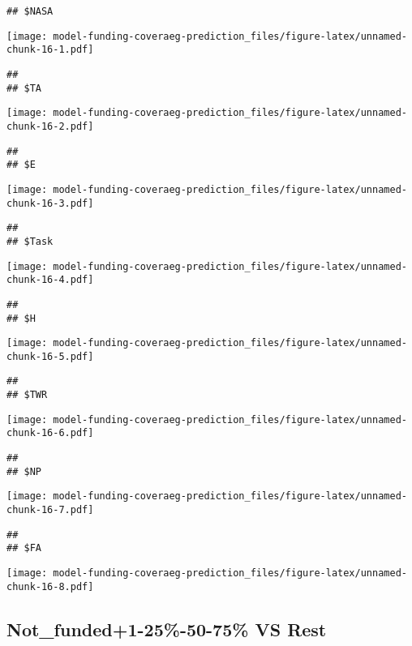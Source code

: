 \documentclass[]{article}
\begin{document}
\begin{verbatim}
## $NASA
\end{verbatim}

\texttt{[image: model-funding-coveraeg-prediction\_files/figure-latex/unnamed-chunk-16-1.pdf]}

\begin{verbatim}
## 
## $TA
\end{verbatim}

\texttt{[image: model-funding-coveraeg-prediction\_files/figure-latex/unnamed-chunk-16-2.pdf]}

\begin{verbatim}
## 
## $E
\end{verbatim}

\texttt{[image: model-funding-coveraeg-prediction\_files/figure-latex/unnamed-chunk-16-3.pdf]}

\begin{verbatim}
## 
## $Task
\end{verbatim}

\texttt{[image: model-funding-coveraeg-prediction\_files/figure-latex/unnamed-chunk-16-4.pdf]}

\begin{verbatim}
## 
## $H
\end{verbatim}

\texttt{[image: model-funding-coveraeg-prediction\_files/figure-latex/unnamed-chunk-16-5.pdf]}

\begin{verbatim}
## 
## $TWR
\end{verbatim}

\texttt{[image: model-funding-coveraeg-prediction\_files/figure-latex/unnamed-chunk-16-6.pdf]}

\begin{verbatim}
## 
## $NP
\end{verbatim}

\texttt{[image: model-funding-coveraeg-prediction\_files/figure-latex/unnamed-chunk-16-7.pdf]}

\begin{verbatim}
## 
## $FA
\end{verbatim}

\texttt{[image: model-funding-coveraeg-prediction\_files/figure-latex/unnamed-chunk-16-8.pdf]}

\newpage

\hypertarget{not_funded1-25-50-75-vs-rest}{%
\subsection{Not\_funded+1-25\%-50-75\% VS
Rest}\label{not_funded1-25-50-75-vs-rest}}
\end{document}
